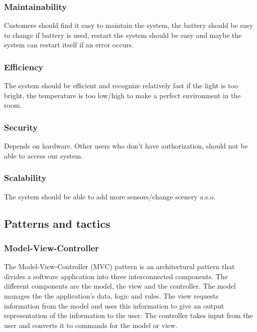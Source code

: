 \documentclass[../document]{subfiles}
\begin{document}
\subsubsection{Maintainability}
Customers should find it easy to maintain the system, the battery should be easy to change if battery is used, restart the system should be easy and maybe the system can restart itself if an error occurs. 

\subsubsection{Efficiency}
The system should be efficient and recognize relatively fast if the light is too bright, the temperature is too low/high to make a perfect environment in the room. 

\subsubsection{Security}
Depends on hardware. Other users who don't have authorization, should not be able to access our system.

\subsubsection{Scalability}
The system should be able to add more sensors/change scenery a.s.o.  

\subsection{Patterns and tactics}
\subsubsection{Model-View-Controller}
The Model-View-Controller (MVC) pattern is an architectural pattern that divides a software application into three interconnected components. The different components are the model, the view and the controller. The model manages the the application’s data, logic and rules. The view requests information from the model and uses this information to give an output representation of the information to the user. The controller takes input from the user and converts it to commands for the model or view. 
\end{document}
